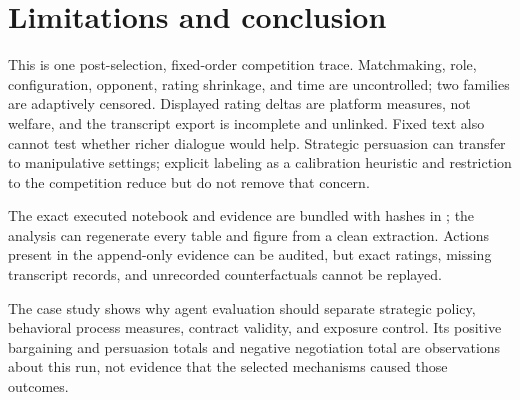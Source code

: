 \section{Limitations and conclusion}

This is one post-selection, fixed-order competition trace. Matchmaking, role,
configuration, opponent, rating shrinkage, and time are uncontrolled; two
families are adaptively censored. Displayed rating deltas are platform measures,
not welfare, and the transcript export is incomplete and unlinked. Fixed text
also cannot test whether richer dialogue would help. Strategic persuasion can
transfer to manipulative settings; explicit labeling as a calibration heuristic
and restriction to the competition reduce but do not remove that concern.

The exact executed notebook and evidence are bundled with hashes in
; the analysis can regenerate every table and figure from a
clean extraction. Actions present in the append-only evidence can be audited,
but exact ratings, missing transcript records, and unrecorded counterfactuals
cannot be replayed.

The case study shows why agent evaluation should separate strategic policy,
behavioral process measures, contract validity, and exposure control. Its
positive bargaining and persuasion totals and negative negotiation total are
observations about this run, not evidence that the selected mechanisms caused
those outcomes.
